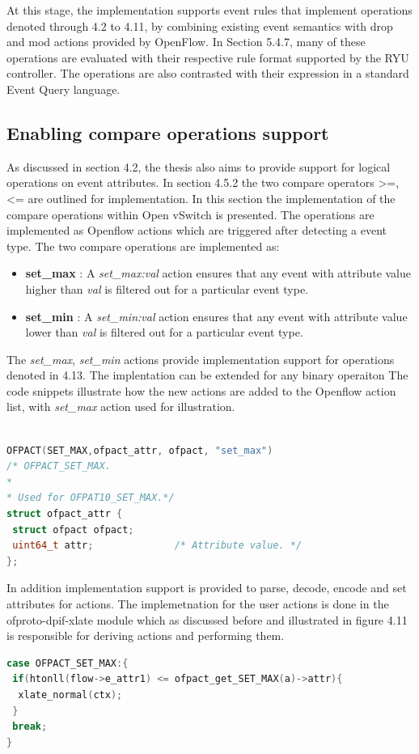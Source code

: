 At this stage, the implementation supports event rules that implement operations denoted through 4.2 to 4.11, by combining existing event semantics with drop and mod actions provided by OpenFlow. In Section 5.4.7, many of these operations are evaluated with their respective rule format supported by the RYU controller. The operations are also contrasted with their expression in a standard Event Query language.



\subsection{Enabling compare operations support}
As discussed in section 4.2, the thesis also aims to provide support for logical operations on event attributes. In section 4.5.2 the two compare operators {>=, <=} are outlined for implementation. In this section the implementation of the compare operations within Open vSwitch is presented. The operations are implemented as Openflow actions which are triggered after detecting a event type. The two compare operations are implemented as:
\begin{itemize}
 \item \textbf{set_max} : A \textit{set_max:val} action ensures that any event with attribute value higher than \textit{val} is filtered out for a particular event type.
 \item \textbf{set_min} : A \textit{set_min:val} action ensures that any event with attribute value lower than \textit{val} is filtered out for a particular event type.
\end{itemize}
The \textit{set_max}, \textit{set_min} actions provide implementation support for operations denoted in 4.13. The implentation can be extended for any binary operaiton The code snippets illustrate  how the new actions are added to the Openflow action list, with \textit{set_max} action used for illustration. \newline

\begin{lstlisting}[language=c]

OFPACT(SET_MAX,ofpact_attr, ofpact, "set_max")      
/* OFPACT_SET_MAX.
*
* Used for OFPAT10_SET_MAX.*/
struct ofpact_attr {
 struct ofpact ofpact;
 uint64_t attr;              /* Attribute value. */
};
\end{lstlisting}

In addition implementation support is provided to parse, decode, encode and set attributes for actions. The implemetnation for the user actions is done in the ofproto-dpif-xlate module which as discussed before and illustrated in figure 4.11 is responsible for deriving actions and performing them. \newline
\begin{lstlisting}[language=c]
case OFPACT_SET_MAX:{        
 if(htonll(flow->e_attr1) <= ofpact_get_SET_MAX(a)->attr){
  xlate_normal(ctx);
 }
 break;    
}
\end{lstlisting}

